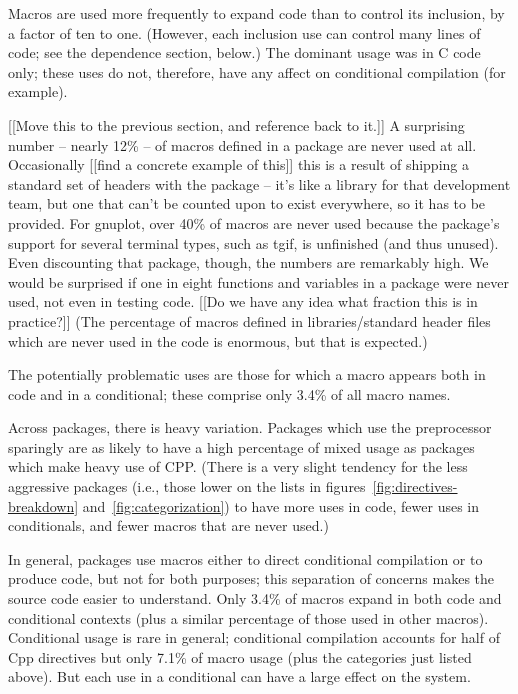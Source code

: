 \documentclass[10pt]{article}
\begin{document}
      Macros are used more frequently to expand code than to control its
        inclusion, by a factor of ten to one.  (However, each inclusion use
        can control many lines of code; see the dependence section, below.)
The dominant usage was in C code only; these uses
do not, therefore, have any affect on conditional compilation (for example).

[[Move this to the previous section, and reference back to it.]]
      A surprising number -- nearly 12\% -- of macros defined in a package
        are never used at all.  Occasionally [[find a concrete example of
        this]] this is a result of shipping a 
        standard set of headers with the package -- it's like a library for
        that development team, but one that can't be counted upon to exist
        everywhere, so it has to be provided.  For gnuplot, over 40\% of
        macros are never used because the package's support for several
        terminal types, such as tgif, is unfinished (and thus unused).
        Even discounting that package, though, the numbers are remarkably
        high.  We would be surprised if one in eight functions and
        variables in a package were never used, not even in testing code.
        [[Do we have any idea what fraction this is in practice?]]
        (The percentage of macros defined in libraries/standard header
        files which are never used in the code is enormous, but that is
        expected.)

      The potentially problematic uses are those for which a macro appears
        both in code and in a conditional; these comprise only 3.4\% of all
        macro names.

      Across packages, there is heavy variation.  Packages which use
        the preprocessor sparingly are as likely to have a high percentage
        of mixed usage as packages which make heavy use of CPP.  (There is
        a very slight tendency for the less aggressive packages (i.e.,
        those lower on the lists in figures~\ref{fig:directives-breakdown}
        and~\ref{fig:categorization}) to have more uses in code, fewer uses
        in conditionals, and fewer macros that are never used.)

In general, packages use macros either to direct conditional compilation or
to produce code, but not for both purposes; this separation of concerns
makes the source code easier to understand.  Only 3.4\% of macros expand in
both code and conditional contexts (plus a similar percentage of those used
in other macros). 
Conditional usage is rare in general; conditional compilation accounts for
half of Cpp directives but only 7.1\% of macro usage (plus the categories just
listed above).  But each use in a conditional can have a large effect on
the system.
\end{document}
